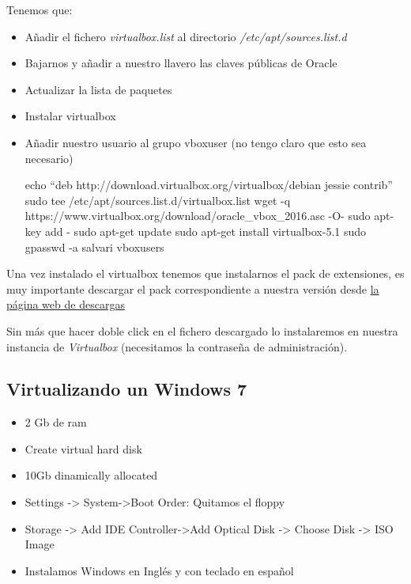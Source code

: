 \documentclass[12pt,spanish,]{scrartcl}
\providecommand{\tightlist}{%
  \setlength{\itemsep}{0pt}\setlength{\parskip}{0pt}}
\begin{document}
Tenemos que:

\begin{itemize}
\item
  Añadir el fichero \emph{virtualbox.list} al directorio
  \emph{/etc/apt/sources.list.d}
\item
  Bajarnos y añadir a nuestro llavero las claves públicas de Oracle
\item
  Actualizar la lista de paquetes
\item
  Instalar virtualbox
\item
  Añadir nuestro usuario al grupo vboxuser (no tengo claro que esto sea
  necesario)

  echo ``deb http://download.virtualbox.org/virtualbox/debian jessie
  contrib'' \textbar{}sudo tee /etc/apt/sources.list.d/virtualbox.list
  wget -q https://www.virtualbox.org/download/oracle\_vbox\_2016.asc -O-
  \textbar{} sudo apt-key add - sudo apt-get update sudo apt-get install
  virtualbox-5.1 sudo gpasswd -a salvari vboxusers
\end{itemize}

Una vez instalado el virtualbox tenemos que instalarnos el pack de
extensiones, es muy importante descargar el pack correspondiente a
nuestra versión desde
\href{https://www.virtualbox.org/wiki/Downloads?}{la página web de
descargas}

Sin más que hacer doble click en el fichero descargado lo instalaremos
en nuestra instancia de \emph{Virtualbox} (necesitamos la contraseña de
administración).

\hypertarget{virtualizando-un-windows-7}{%
\subsection{Virtualizando un Windows
7}\label{virtualizando-un-windows-7}}

\begin{itemize}
\tightlist
\item
  2 Gb de ram
\item
  Create virtual hard disk
\item
  10Gb dinamically allocated
\item
  Settings -\textgreater{} System-\textgreater{}Boot Order: Quitamos el
  floppy
\item
  Storage -\textgreater{} Add IDE Controller-\textgreater{}Add Optical
  Disk -\textgreater{} Choose Disk -\textgreater{} ISO Image
\item
  Instalamos Windows en Inglés y con teclado en español
\end{itemize}
\end{document}
